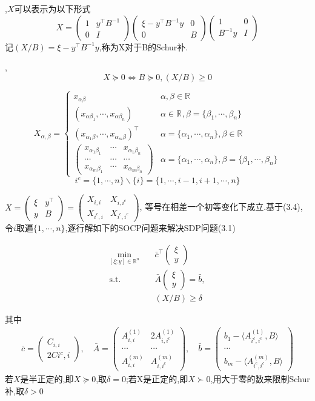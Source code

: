 \documentclass[UTF8]{ctexart}
\newcommand{\s}{\quad}
\renewcommand{\b}{\textbf}
\newcommand{\p}{\paragraph{}\s}
\newcommand{\equSplit}[1]{\begin{equation}\begin{split}#1\end{split}\end{equation}}
\newcommand{\equ}[1]{\begin{equation}#1\end{equation}}
\newcommand{\Tst}{\text{s.t.}\s}
\newcommand{\inprod}[1]{\langle#1\rangle}
\newcommand{\Real}[1]{\mathbb{R}^{#1}}
\newcommand{\pMa}[1]{\begin{pmatrix}#1\end{pmatrix}}
\numberwithin{equation}{section}
\begin{document}
,$X$可以表示为以下形式
\equ{
	X=\pMa{1&y^\top B^{-1}\\0&I}\pMa{\xi-y^\top B^{-1}y&0\\0&B}\pMa{1&0\\B^{-1}y&I}
}
记$(X/B)=\xi-y^\top B^{-1}y$,称为X对于B的Schur补.

,\equ{X\succeq0\Leftrightarrow B\succeq0,(X/B)\geq0}

\equ{
	X_{\alpha,\beta}=
	\begin{cases}
		x_{\alpha\beta}
		&\alpha,\beta\in\Real{}\\
		(x_{\alpha\beta_1},\cdots,x_{\alpha\beta_n})
		&\alpha\in\Real{},\beta=\{\beta_1,\cdots,\beta_n\}\\
		(x_{\alpha_1\beta},\cdots,x_{\alpha_m\beta})^\top
		&\alpha=\{\alpha_1,\cdots,\alpha_n\},\beta\in\Real{}\\
		\pMa{
		x_{\alpha_1\beta_1} & \cdots & x_{\alpha_1\beta_n} \\
		\cdots              & \cdots & \cdots              \\
		x_{\alpha_m\beta_1} & \cdots & x_{\alpha_m\beta_n}
		}
		&\alpha=\{\alpha_1,\cdots,\alpha_n\},\beta=\{\beta_1,\cdots,\beta_n\}
	\end{cases}
}
\equ{i^c=\{1,\cdots,n\}\backslash\{i\}=\{1,\cdots,i-1,i+1,\cdots,n\}}

$X=\pMa{\xi&y^\top\\ y&B}=\pMa{X_{i,i}&X_{i,i^c}\\X_{i^c,i}&X_{i^c,i^c}}$,
等号在相差一个初等变化下成立.基于(3.4),
令$i$取遍$\{1,\cdots,n\}$,逐行解如下的SOCP问题来解决SDP问题(3.1)

\equSplit{
	\min_{[\xi;y]\in\Real{n}}\s&\bar{c}^\top\pMa{\xi\\y}\\
	\Tst&\bar{A}\pMa{\xi\\y}=\bar{b},\\
	&(X/B)\geq\delta
}

其中
\equSplit{
	\bar{c}=\pMa{C_{i,i}\\2C{i^c,i}},\s
	\bar{A}=\pMa{A^(1)_{i,i}&2A^(1)_{i,i^c}\\\cdots&\cdots\\A^(m)_{i,i}&A^(m)_{i,i^c}},\s
	\bar{b}=\pMa{b_1-\inprod{A^(1)_{i^c,i^c},B}\\\cdots\\b_m-\inprod{A^(m)_{i^c,i^c},B}}
}
若$X$是半正定的,即$X\succeq0$,取$\delta=0$;若X是正定的,即$X\succ0$,用大于零的数来限制Schur补,取$\delta>0$
\end{document}
